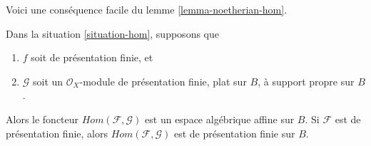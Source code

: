 \noindent
Voici une conséquence facile du lemme \ref{lemma-noetherian-hom}.

\begin{proposition}
\label{proposition-hom}
Dans la situation \ref{situation-hom}, supposons que
\begin{enumerate}
\item $f$ soit de présentation finie, et
\item $\mathcal{G}$ soit un $\mathcal{O}_X$-module de présentation finie,
plat sur $B$, à support propre sur $B$.
\end{enumerate}
Alors le foncteur $\mathit{Hom}(\mathcal{F}, \mathcal{G})$ est un espace
algébrique affine sur $B$. Si $\mathcal{F}$ est de présentation finie, alors
$\mathit{Hom}(\mathcal{F}, \mathcal{G})$ est de présentation finie sur $B$.
\end{proposition}

